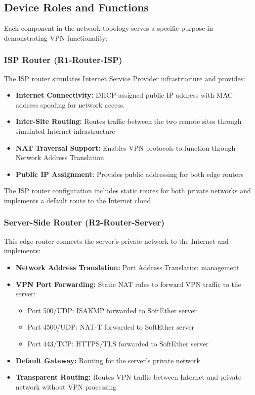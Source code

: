 \subsection{Device Roles and Functions}

Each component in the network topology serves a specific purpose in demonstrating VPN functionality:

\subsubsection{ISP Router (R1-Router-ISP)}

The ISP router simulates Internet Service Provider infrastructure and provides:

\begin{itemize}
    \item \textbf{Internet Connectivity:} DHCP-assigned public IP address with MAC address spoofing for network access.
    \item \textbf{Inter-Site Routing:} Routes traffic between the two remote sites through simulated Internet infrastructure
    \item \textbf{NAT Traversal Support:} Enables VPN protocols to function through Network Address Translation
    \item \textbf{Public IP Assignment:} Provides public addressing for both edge routers
\end{itemize}

The ISP router configuration includes static routes for both private networks and implements a default route to the Internet cloud.

\subsubsection{Server-Side Router (R2-Router-Server)}

This edge router connects the server's private network to the Internet and implements:

\begin{itemize}
    \item \textbf{Network Address Translation:} Port Address Translation management
    \item \textbf{VPN Port Forwarding:} Static NAT rules to forward VPN traffic to the server:
    \begin{itemize}
        \item Port 500/UDP: ISAKMP forwarded to SoftEther server
        \item Port 4500/UDP: NAT-T forwarded to SoftEther server
        \item Port 443/TCP: HTTPS/TLS forwarded to SoftEther server
    \end{itemize}
    \item \textbf{Default Gateway:} Routing for the server's private network
    \item \textbf{Transparent Routing:} Routes VPN traffic between Internet and private network without VPN processing
\end{itemize}

